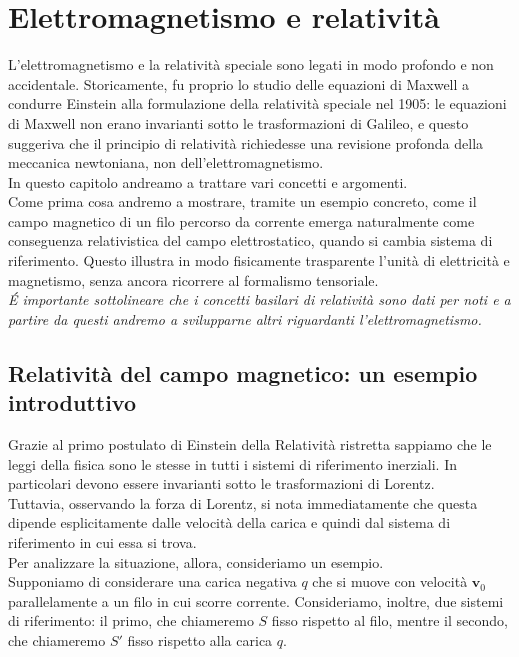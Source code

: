 \chapter{Elettromagnetismo e relatività}


L'elettromagnetismo e la relatività speciale sono legati in modo profondo e non accidentale. 
Storicamente, fu proprio lo studio delle equazioni di Maxwell a condurre Einstein alla formulazione della relatività speciale nel 1905: le equazioni di Maxwell non erano invarianti sotto le trasformazioni di Galileo, e questo suggeriva che il principio di relatività richiedesse una revisione profonda della meccanica newtoniana, non dell'elettromagnetismo.\\

In questo capitolo andreamo a trattare vari concetti e argomenti.\\

Come prima cosa andremo a mostrare, tramite un esempio concreto, come il campo magnetico di un filo percorso da corrente emerga naturalmente come conseguenza relativistica del campo elettrostatico, quando si cambia sistema di riferimento. 
Questo illustra in modo fisicamente trasparente l'unità di elettricità e magnetismo, senza ancora ricorrere al formalismo tensoriale.\\

\emph{\'E importante sottolineare che i concetti basilari di relatività sono dati per noti e a partire da questi andremo a svilupparne altri riguardanti l'elettromagnetismo.} 

\section{Relatività del campo magnetico: un esempio introduttivo}

Grazie al primo postulato di Einstein della Relatività ristretta sappiamo che le leggi della fisica sono le stesse in tutti i sistemi di riferimento inerziali. In particolari devono essere invarianti sotto le trasformazioni di Lorentz. \\

Tuttavia, osservando la forza di Lorentz, si nota immediatamente che questa dipende esplicitamente dalle velocità della carica e quindi dal sistema di riferimento in cui essa si trova. \\
Per analizzare la situazione, allora, consideriamo un esempio. \\

Supponiamo di considerare una carica negativa $q$ che si muove con velocità $\mathbf{v}_0$ parallelamente a un filo in cui scorre corrente. Consideriamo, inoltre, due sistemi di riferimento: il primo, che chiameremo $S$ fisso rispetto al filo, mentre il secondo, che chiameremo $S'$ fisso rispetto alla carica $q$.

